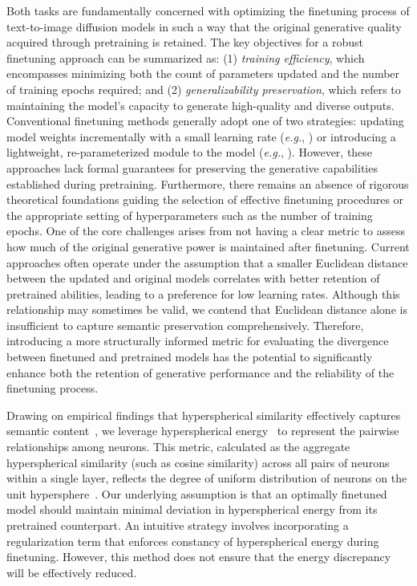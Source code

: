 Both tasks are fundamentally concerned with optimizing the finetuning process of text-to-image diffusion models in such a way that the original generative quality acquired through pretraining is retained. The key objectives for a robust finetuning approach can be summarized as: (1) \emph{training efficiency}, which encompasses minimizing both the count of parameters updated and the number of training epochs required; and (2) \emph{generalizability preservation}, which refers to maintaining the model's capacity to generate high-quality and diverse outputs. Conventional finetuning methods generally adopt one of two strategies: updating model weights incrementally with a small learning rate (\emph{e.g.}, \cite{ruiz2023dreambooth}) or introducing a lightweight, re-parameterized module to the model (\emph{e.g.}, \cite{hulora2022,zhang2023adding}). However, these approaches lack formal guarantees for preserving the generative capabilities established during pretraining. Furthermore, there remains an absence of rigorous theoretical foundations guiding the selection of effective finetuning procedures or the appropriate setting of hyperparameters such as the number of training epochs. One of the core challenges arises from not having a clear metric to assess how much of the original generative power is maintained after finetuning. Current approaches often operate under the assumption that a smaller Euclidean distance between the updated and original models correlates with better retention of pretrained abilities, leading to a preference for low learning rates. Although this relationship may sometimes be valid, we contend that Euclidean distance alone is insufficient to capture semantic preservation comprehensively. Therefore, introducing a more structurally informed metric for evaluating the divergence between finetuned and pretrained models has the potential to significantly enhance both the retention of generative performance and the reliability of the finetuning process.

Drawing on empirical findings that hyperspherical similarity effectively captures semantic content~\cite{liu2017deep,liu2018decoupled,chen2020angular}, we leverage hyperspherical energy~\cite{liu2018learning} to represent the pairwise relationships among neurons. This metric, calculated as the aggregate hyperspherical similarity (such as cosine similarity) across all pairs of neurons within a single layer, reflects the degree of uniform distribution of neurons on the unit hypersphere~\cite{liu2021learning}. Our underlying assumption is that an optimally finetuned model should maintain minimal deviation in hyperspherical energy from its pretrained counterpart. An intuitive strategy involves incorporating a regularization term that enforces constancy of hyperspherical energy during finetuning. However, this method does not ensure that the energy discrepancy will be effectively reduced. 

